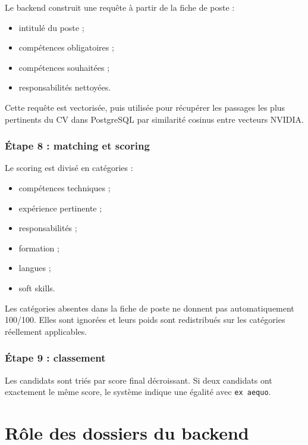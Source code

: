 \documentclass[12pt,a4paper]{report}
\begin{document}
Le backend construit une requête à partir de la fiche de poste :

\begin{itemize}
    \item intitulé du poste ;
    \item compétences obligatoires ;
    \item compétences souhaitées ;
    \item responsabilités nettoyées.
\end{itemize}

Cette requête est vectorisée, puis utilisée pour récupérer les passages les plus pertinents du CV dans PostgreSQL par similarité cosinus entre vecteurs NVIDIA.

\subsection{Étape 8 : matching et scoring}

Le scoring est divisé en catégories :

\begin{itemize}
    \item compétences techniques ;
    \item expérience pertinente ;
    \item responsabilités ;
    \item formation ;
    \item langues ;
    \item soft skills.
\end{itemize}

Les catégories absentes dans la fiche de poste ne donnent pas automatiquement 100/100. Elles sont ignorées et leurs poids sont redistribués sur les catégories réellement applicables.

\subsection{Étape 9 : classement}

Les candidats sont triés par score final décroissant. Si deux candidats ont exactement le même score, le système indique une égalité avec \texttt{ex aequo}.

\chapter{Rôle des dossiers du backend}
\end{document}
